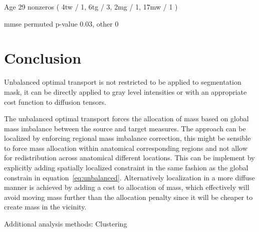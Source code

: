 \documentclass{llncs}
\begin{document}
Age 29 nonzeros   ( 4tw / 1, 6tg / 3,  2mg / 1, 17mw / 1 ) 

mmse permuted p-value 0.03, other 0

\section{Conclusion}

Unbalanced optimal transport is not restricted to be applied to segmentation
mask, it can be directly applied to gray level intensities or with an
appropriate cost function to diffusion tensors. 

The unbalanced optimal transport forces the allocation of mass based on global
mass imbalance between the source and target measures. The approach can be
localized by enforcing regional mass imbalance correction, this might be
sensible to force mass allocation within anatomical corresponding regions and
not allow for redistribution across anatomical different locations. This can be
implement by explicitly adding spatially localized constraint in the same
fashion as the global constrain in equation~\ref{eq:unbalanced}. Alternatively
localization in a more diffuse manner is achieved by adding a cost to
allocation of mass, which effectively will avoid moving mass further than the
allocation penalty since it will be cheaper to create mass in the vicinity.

Additional analysis methods: Clustering



\end{document}
